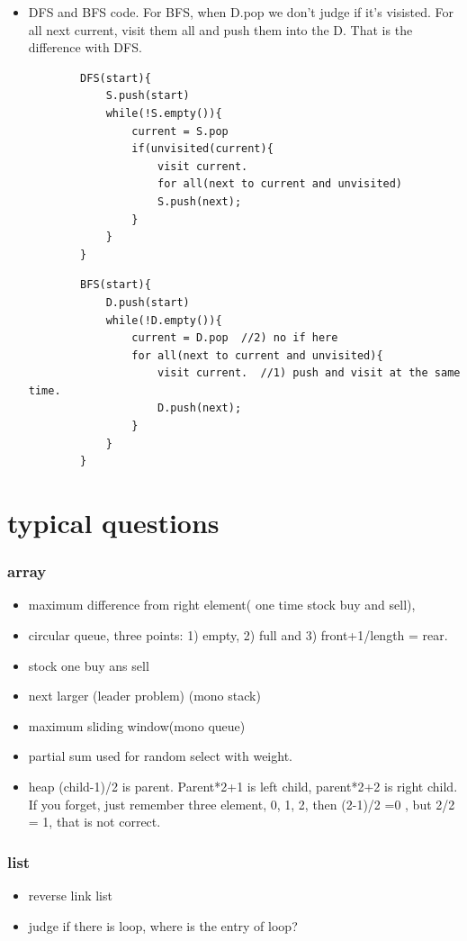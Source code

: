 \documentclass[a4paper,11pt,twoside]{book}
\begin{document}
\begin{itemize}
	\item DFS and BFS code. For BFS, when D.pop we don't judge if it's visisted.  For all next current, visit them all and push them into the D. That is the difference with DFS.
	\begin{lstlisting}
		DFS(start){
			S.push(start)  
			while(!S.empty()){
				current = S.pop
				if(unvisited(current){
					visit current.
					for all(next to current and unvisited)
					S.push(next);
				}
			}
		}	
	\end{lstlisting}
	
	\begin{lstlisting} 
		BFS(start){
			D.push(start)  
			while(!D.empty()){
				current = D.pop  //2) no if here
				for all(next to current and unvisited){
					visit current.  //1) push and visit at the same time. 
					D.push(next);
				}
			}
		}
	\end{lstlisting}
	
\end{itemize}

\section{typical questions}
\subsubsection{array}
\begin{itemize}
	
	\item maximum difference from right element( one time stock buy and sell), 
	
	\item circular queue, three points: 1) empty, 2) full and 3) front+1/length = rear. 
	
	
	\item stock one buy ans sell
	\item next larger (leader problem) (mono stack)
	\item maximum sliding window(mono queue)
	\item partial sum used for random select with weight. 
	
	\item heap (child-1)/2 is parent.  Parent*2+1 is left child, parent*2+2 is right child. If you forget, just remember three element, 0, 1, 2, then  (2-1)/2 =0 , but 2/2 = 1, that is not correct. 
	
	
\end{itemize}
\subsubsection{list}
\begin{itemize}
	\item reverse link list
	\item judge if there is loop, where is the entry of loop? 
\end{itemize}
\end{document}
